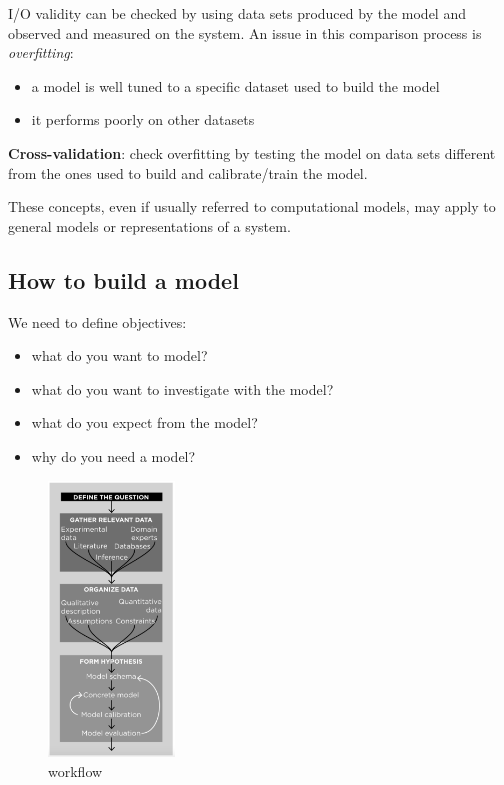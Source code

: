 I/O validity can be checked by using data sets produced by the model and
observed and measured on the system. An issue in this comparison process
is \emph{overfitting}:

\begin{itemize}
\tightlist
\item
  a model is well tuned to a specific dataset used to build the model
\item
  it performs poorly on other datasets
\end{itemize}

\textbf{Cross-validation}: check overfitting by testing the model on
data sets different from the ones used to build and calibrate/train the
model.

These concepts, even if usually referred to computational models, may
apply to general models or representations of a system.

\hypertarget{how-to-build-a-model}{%
\subsection{How to build a model}\label{how-to-build-a-model}}

We need to define objectives:

\begin{itemize}
\tightlist
\item
  what do you want to model?
\item
  what do you want to investigate with the model?
\item
  what do you expect from the model?
\item
  why do you need a model?
\end{itemize}

\begin{figure}
\centering
\includegraphics[width=0.3\textwidth]{workflow.png}
\caption{workflow}
\end{figure}

